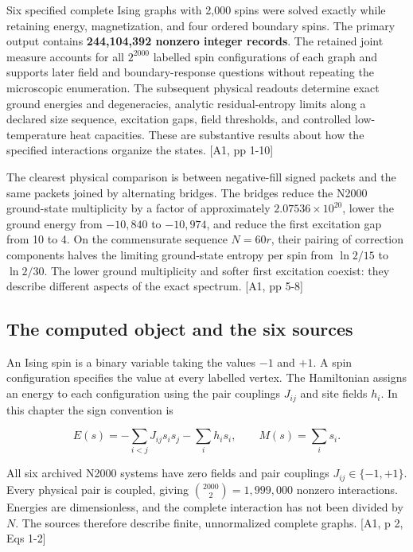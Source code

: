 \label{n2000-exact-joint-densities-and-low-energy-physics}

Six specified complete Ising graphs with 2,000 spins were solved exactly while retaining energy, magnetization, and four ordered boundary spins. The primary output contains \textbf{244,104,392 nonzero integer records}. The retained joint measure accounts for all \(2^{2000}\) labelled spin configurations of each graph and supports later field and boundary-response questions without repeating the microscopic enumeration. The subsequent physical readouts determine exact ground energies and degeneracies, analytic residual-entropy limits along a declared size sequence, excitation gaps, field thresholds, and controlled low-temperature heat capacities. These are substantive results about how the specified interactions organize the states. {[}A1, pp 1-10{]}

The clearest physical comparison is between negative-fill signed packets and the same packets joined by alternating bridges. The bridges reduce the N2000 ground-state multiplicity by a factor of approximately \(2.07536\times10^{20}\), lower the ground energy from \(-10,840\) to \(-10,974\), and reduce the first excitation gap from 10 to 4. On the commensurate sequence \(N=60r\), their pairing of correction components halves the limiting ground-state entropy per spin from \(\ln 2/15\) to \(\ln 2/30\). The lower ground multiplicity and softer first excitation coexist: they describe different aspects of the exact spectrum. {[}A1, pp 5-8{]}

\subsection{The computed object and the six sources}\label{the-computed-object-and-the-six-sources}

An Ising spin is a binary variable taking the values \(-1\) and \(+1\). A spin configuration specifies the value at every labelled vertex. The Hamiltonian assigns an energy to each configuration using the pair couplings \(J_{ij}\) and site fields \(h_i\). In this chapter the sign convention is

\[E(s)=-\sum_{i<j}J_{ij}s_i s_j-\sum_i h_i s_i,\qquad M(s)=\sum_i s_i.\]

All six archived N2000 systems have zero fields and pair couplings \(J_{ij}\in\{-1,+1\}\). Every physical pair is coupled, giving \(\binom{2000}{2}=1,999,000\) nonzero interactions. Energies are dimensionless, and the complete interaction has not been divided by \(N\). The sources therefore describe finite, unnormalized complete graphs. {[}A1, p 2, Eqs 1-2{]}

